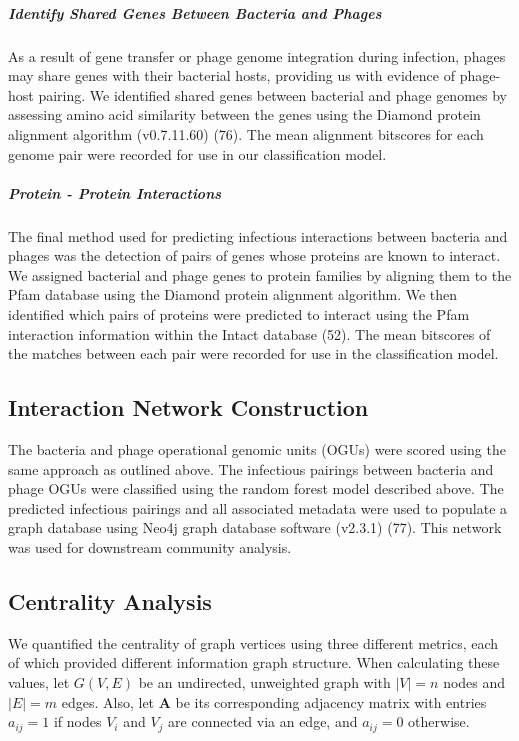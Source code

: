 \documentclass[12pt,]{article}
\let\oldsubparagraph\subparagraph
\renewcommand{\subparagraph}[1]{\oldsubparagraph{#1}\mbox{}}
\begin{document}
\subparagraph{Identify Shared Genes Between Bacteria and
Phages}\label{identify-shared-genes-between-bacteria-and-phages}

As a result of gene transfer or phage genome integration during
infection, phages may share genes with their bacterial hosts, providing
us with evidence of phage-host pairing. We identified shared genes
between bacterial and phage genomes by assessing amino acid similarity
between the genes using the Diamond protein alignment algorithm
(v0.7.11.60) (76). The mean alignment bitscores for each genome pair
were recorded for use in our classification model.

\subparagraph{Protein - Protein
Interactions}\label{protein---protein-interactions}

The final method used for predicting infectious interactions between
bacteria and phages was the detection of pairs of genes whose proteins
are known to interact. We assigned bacterial and phage genes to protein
families by aligning them to the Pfam database using the Diamond protein
alignment algorithm. We then identified which pairs of proteins were
predicted to interact using the Pfam interaction information within the
Intact database (52). The mean bitscores of the matches between each
pair were recorded for use in the classification model.

\subsection{Interaction Network
Construction}\label{interaction-network-construction}

The bacteria and phage operational genomic units (OGUs) were scored
using the same approach as outlined above. The infectious pairings
between bacteria and phage OGUs were classified using the random forest
model described above. The predicted infectious pairings and all
associated metadata were used to populate a graph database using Neo4j
graph database software (v2.3.1) (77). This network was used for
downstream community analysis.

\subsection{Centrality Analysis}\label{centrality-analysis}

We quantified the centrality of graph vertices using three different
metrics, each of which provided different information graph structure.
When calculating these values, let \(G(V,E)\) be an undirected,
unweighted graph with \(|V|=n\) nodes and \(|E|=m\) edges. Also, let
\(\mathbf{A}\) be its corresponding adjacency matrix with entries
\(a_{ij} = 1\) if nodes \(V_i\) and \(V_j\) are connected via an edge,
and \(a_{ij} = 0\) otherwise.
\end{document}
